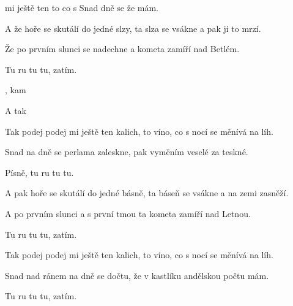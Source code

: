 

\zs
	  mi ještě ten  
  to  co s   
	Snad  dně se 
  že   mám. 
	 
\ks

\zs
	A že hoře se skutálí do jedné slzy,
	ta slza se vsákne a pak ji to mrzí.

  Že po prvním slunci se nadechne
	a kometa zamíří nad Betlém.

  Tu ru tu tu, zatím.
\ks

\zr
	  , kam 

     

  A tak    
	   
\kr

\zs
	Tak podej podej mi ještě ten kalich,
	to víno, co s nocí se měnívá na líh.

	Snad na dně se perlama zaleskne,
	pak vyměním veselé za teskné.

	Písně, tu ru tu tu.
\ks

\zs
	A pak hoře se skutálí do jedné básně,
	ta báseň se vsákne a na zemi zasněží.

  A po prvním slunci a s první tmou
	ta kometa zamíří nad Letnou.

  Tu ru tu tu, zatím.
\ks

\zr
\kr

\zs
	Tak podej podej mi ještě ten kalich,
	to víno, co s nocí se měnívá na líh.

	Snad nad ránem na dně se dočtu,
	že v kastlíku andělskou počtu mám.

	Tu ru tu tu, zatím.
\ks

\zr
\kr

\kp

